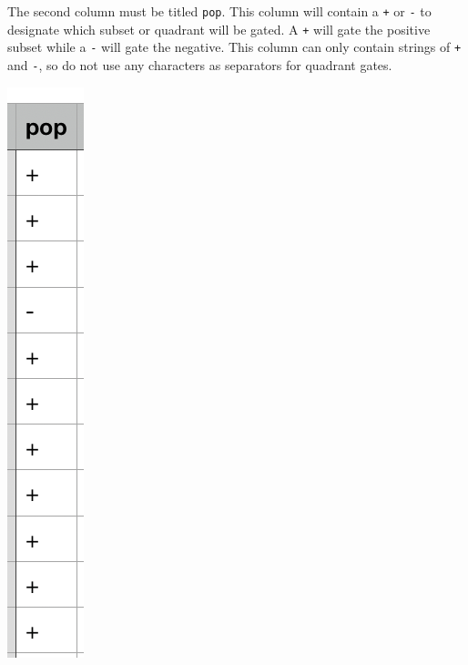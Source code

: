 \documentclass[]{book}
\begin{document}
The second column must be titled \texttt{pop}. This column will contain a \texttt{+} or \texttt{-} to designate which subset or quadrant will be gated. A \texttt{+} will gate the positive subset while a \texttt{-} will gate the negative. This column can only contain strings of \texttt{+} and \texttt{-}, so do not use any characters as separators for quadrant gates.

\includegraphics[width=0.6\linewidth]{./tutorial/images/pop}
\end{document}
